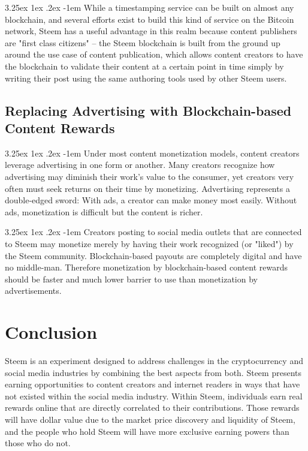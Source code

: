 \documentclass{article}
\makeatletter
\renewcommand\paragraph{\@startsection{paragraph}{5}{\z@}%
  {3.25ex \@plus1ex \@minus.2ex}%
  {-1em}%
  {\normalfont\normalsize\bfseries}}
\makeatother
\begin{document}
			\paragraph{}
				While a timestamping service can be built on almost any blockchain, and several efforts exist to build this kind of service on the Bitcoin network, Steem has a useful advantage in this realm because content publishers are "first class citizens" -- the Steem blockchain is built from the ground up around the use case of content publication, which allows content creators to have the blockchain to validate their content at a certain point in time simply by writing their post using the same authoring tools used by other Steem users.

		\subsection{Replacing Advertising with Blockchain-based Content Rewards}

			\paragraph{}
				Under most content monetization models, content creators leverage advertising in one form or another. Many creators recognize how advertising may diminish their work's value to the consumer, yet creators very often must seek returns on their time by monetizing. Advertising represents a double-edged sword: With ads, a creator can make money most easily. Without ads, monetization is difficult but the content is richer.

			\paragraph{}
				Creators posting to social media outlets that are connected to Steem may monetize merely by having their work recognized (or "liked") by the Steem community. Blockchain-based payouts are completely digital and have no middle-man. Therefore monetization by blockchain-based content rewards should be faster and much lower barrier to use than monetization by advertisements.

	\section{Conclusion}
		Steem is an experiment designed to address challenges in the cryptocurrency and social media industries by combining the best aspects from both. Steem presents earning opportunities to content creators and internet readers in ways that have not existed within the social media industry. Within Steem, individuals earn real rewards online that are directly correlated to their contributions. Those rewards will have dollar value due to the market price discovery and liquidity of Steem, and the people who hold Steem will have more exclusive earning powers than those who do not.
\end{document}
